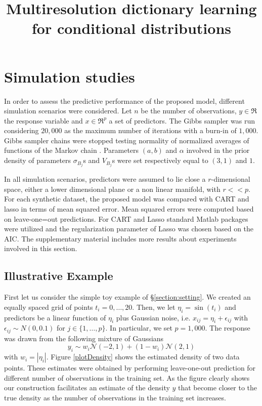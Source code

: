 \documentclass{article} %
\title{Multiresolution dictionary learning for conditional distributions}
\begin{document}
\maketitle



\section{Simulation studies}\label{section:simulation}

In order to assess the predictive performance of the proposed model, different simulation scenarios were considered. Let $n$ be the number of observations, $y \in \Re$ the response variable and $x \in \Re^p$ a set of predictors. The Gibbs sampler was run considering $20,000$ as the maximum number of iterations with a burn-in of $1,000$. Gibbs sampler chains were stopped testing normality of normalized averages of functions of the Markov chain \cite{Chauveau98anautomated}. Parameters $(a,b)$ and $\alpha$ involved in the prior density of parameters $\sigma_{B_j}$s and $V_{B_j}$s were set respectively equal to $(3,1)$ and $1$.

In all simulation scenarios, predictors were assumed to lie close a $r$-dimensional space, either a lower dimensional plane or a non linear manifold, with $r<<p$. For each synthetic dataset, the proposed model was compared with CART and lasso in terms of mean squared error. Mean squared errors were computed based on leave-one=out predictions. For CART and Lasso standard Matlab packages were utilized and the regularization parameter of Lasso was chosen based on  the AIC. The supplementary material includes more results about experiments involved in this section.

\subsection{Illustrative Example}
First let us consider the simple toy example of \S \ref{section:setting}. We created an equally spaced grid of points $t_i=0, \ldots, 20$. Then, we let $\eta_i=\sin(t_i)$ and predictors be a linear function of $\eta_i$ plus Gaussian noise, i.e. $x_{ij}=\eta_i + \epsilon_{ij}$ with $\epsilon_{ij} \sim N(0,0.1)$ for $j\in \{1, \ldots, p \}$. In particular, we set $p=1,000$. The response was drawn from the following mixture of Gaussians
\begin{equation}
y_i \sim w_i \mathcal{N}(-2,1) + (1-w_i) \mathcal{N}(2,1) 
\end{equation}
with $w_i=|\eta_i|$.  Figure \ref{plotDensity} shows the estimated density of two data points. These estimates were obtained by performing leave-one-out prediction for different number of observations in the training set. As the figure clearly shows our construction facilitates an estimate of the density $y$ that become closer to the true density as the number of observations in the training set increases.
\end{document}
